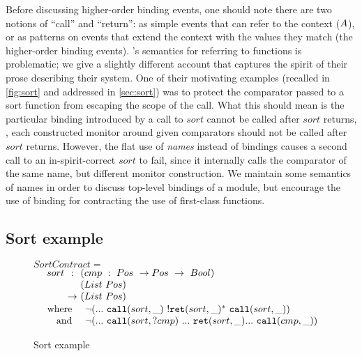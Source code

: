 \documentclass[preprint,onecolumn,9pt]{sigplanconf} %
\begin{document}
Before discussing higher-order binding events, one should note there are two notions of ``call'' and ``return'': as simple events that can refer to the context ($A$), or as patterns on events that extend the context with the values they match (the higher-order binding events).
%
\citeauthor{ianjohnson:dfm:icfp2011}'s semantics for referring to functions is problematic; we give a slightly different account that captures the spirit of their prose describing their system.
%
One of their motivating examples (recalled in \autoref{fig:sort} and addressed in \autoref{sec:sort}) was to protect the comparator passed to a sort function from escaping the scope of the call.
%
What this should mean is the particular binding introduced by a call to $sort$ cannot be called after $sort$ returns, \ie, each constructed monitor around given comparators should not be called after $sort$ returns.
%
However, the flat use of \emph{names} instead of bindings causes a second call to an in-spirit-correct $sort$ to fail, since it internally calls the comparator of the same name, but different monitor construction.
%
We maintain some semantics of names in order to discuss top-level bindings of a module, but encourage the use of binding for contracting the use of first-class functions.

\subsection{Sort example} \label{sec:sort}

\renewcommand{\arraystretch}{1.2}
\newcommand{\call}[1]{\scallev{#1}{\_}}
\newcommand{\ret}[1]{\sretev{#1}{\_}}
\begin{figure}
 \small
 $SortContract = $ \\
 $\begin{array}{ @{\quad~}l@{\ } c @{\ }l }
 sort &:   &(cmp\ :\ Pos\ \to Pos\ \to\ Bool) \\
      &    &(List\ Pos) \\
      &\to &(List\ Pos) \\
 \end{array}$
 $\begin{array}{ @{\quad~}r@{~} l @{}l }
  \text{where}\quad
  &\stnot{(&\sddd~ \call{sort}~ \stmany{\snonevent{\ret{sort}}}~ \call{sort})} \\
  \text{and}\quad
  &\stnot{(&\sddd~ \scallev{sort}{?cmp}~ \sddd~ \ret{sort} \sddd~ \call{cmp})}
 \end{array}$
 \caption{Sort example}
 \label{fig:sort}
\end{figure}
\end{document}

